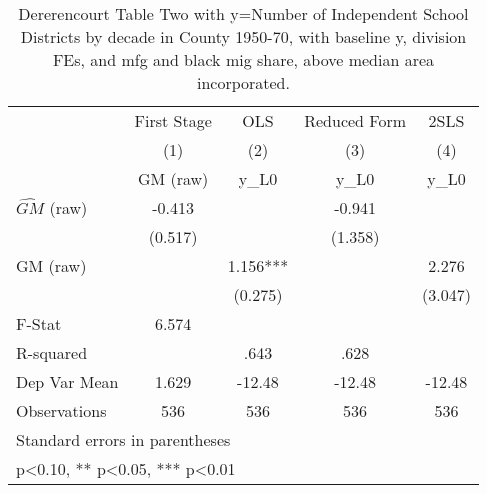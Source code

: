 \begin{table}[htbp]\centering
\def\sym#1{\ifmmode^{#1}\else\(^{#1}\)\fi}
\caption{Dererencourt Table Two with y=Number of Independent School Districts by decade in County 1950-70, with baseline y, division FEs, and mfg and black mig share, above median area incorporated.}
\begin{tabular}{l*{4}{c}}
\toprule
                    & First Stage   &         OLS   &Reduced Form   &        2SLS   \\
                    &\multicolumn{1}{c}{(1)}&\multicolumn{1}{c}{(2)}&\multicolumn{1}{c}{(3)}&\multicolumn{1}{c}{(4)}\\
                    &\multicolumn{1}{c}{GM  (raw)}&\multicolumn{1}{c}{y\_L0}&\multicolumn{1}{c}{y\_L0}&\multicolumn{1}{c}{y\_L0}\\
\midrule
$\hat{GM}$ (raw)    &      -0.413   &               &      -0.941   &               \\
                    &     (0.517)   &               &     (1.358)   &               \\
\addlinespace
GM  (raw)           &               &       1.156***&               &       2.276   \\
                    &               &     (0.275)   &               &     (3.047)   \\
\midrule
F-Stat              &       6.574   &               &               &               \\
R-squared           &               &        .643   &        .628   &               \\
Dep Var Mean        &       1.629   &      -12.48   &      -12.48   &      -12.48   \\
Observations        &         536   &         536   &         536   &         536   \\
\bottomrule
\multicolumn{5}{l}{\footnotesize Standard errors in parentheses}\\
\multicolumn{5}{l}{\footnotesize * p<0.10, ** p<0.05, *** p<0.01}\\
\end{tabular}
\end{table}
